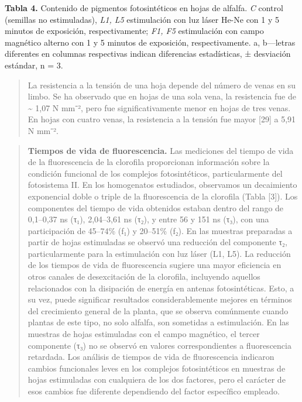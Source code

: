\documentclass[
]{article}
\begin{document}
\textbf{Tabla 4.} Contenido de pigmentos fotosintéticos en hojas de
alfalfa. \emph{C} control (semillas no estimuladas), \emph{L1, L5}
estimulación con luz láser He-Ne con 1 y 5 minutos de exposición,
respectivamente; \emph{F1, F5} estimulación con campo magnético alterno
con 1 y 5 minutos de exposición, respectivamente. a, b---letras
diferentes en columnas respectivas indican diferencias estadísticas, ±
desviación estándar, n = 3.

\begin{quote}
La resistencia a la tensión de una hoja depende del número de venas en
su limbo. Se ha observado que en hojas de una sola vena, la resistencia
fue de \textasciitilde{} 1,07 N mm⁻², pero fue significativamente menor
en hojas de tres venas. En hojas con cuatro venas, la resistencia a la
tensión fue mayor {[}29{]} a 5,91 N mm⁻².
\end{quote}

\begin{quote}
\textbf{Tiempos de vida de fluorescencia.} Las mediciones del tiempo de
vida de la fluorescencia de la clorofila proporcionan información sobre
la condición funcional de los complejos fotosintéticos, particularmente
del fotosistema II. En los homogenatos estudiados, observamos un
decaimiento exponencial doble o triple de la fluorescencia de la
clorofila (Tabla {[}3{]}). Los componentes del tiempo de vida obtenidos
estaban dentro del rango de 0,1--0,37 ns (τ₁), 2,04--3,61 ns (τ₂), y
entre 56 y 151 ns (τ₃), con una participación de 45--74\% (f₁) y
20--51\% (f₂). En las muestras preparadas a partir de hojas estimuladas
se observó una reducción del componente τ₂, particularmente para la
estimulación con luz láser (L1, L5). La reducción de los tiempos de vida
de fluorescencia sugiere una mayor eficiencia en otros canales de
desexcitación de la clorofila, incluyendo aquellos relacionados con la
disipación de energía en antenas fotosintéticas. Esto, a su vez, puede
significar resultados considerablemente mejores en términos del
crecimiento general de la planta, que se observa comúnmente cuando
plantas de este tipo, no solo alfalfa, son sometidas a estimulación. En
las muestras de hojas estimuladas con el campo magnético, el tercer
componente (τ₃) no se observó en valores correspondientes a
fluorescencia retardada. Los análisis de tiempos de vida de
fluorescencia indicaron cambios funcionales leves en los complejos
fotosintéticos en muestras de hojas estimuladas con cualquiera de los
dos factores, pero el carácter de esos cambios fue diferente dependiendo
del factor específico empleado.
\end{quote}
\end{document}
